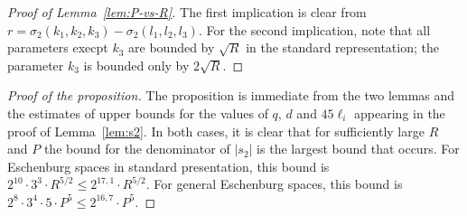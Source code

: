 \documentclass{article}
\newcommand{\abs}[1]{\left|#1\right|}
\begin{document}
\begin{proof}[Proof of Lemma~\ref{lem:P-vs-R}]
The first implication is clear from \(r = \sigma_2(k_1,k_2,k_3) - \sigma_2(l_1,l_2,l_3)\).
For the second implication, note that all parameters execpt \(k_3\) are bounded by \(\sqrt{R}\) in the standard representation; the parameter \(k_3\) is bounded only by \(2\sqrt{R}\).
\end{proof}


\begin{proof}[Proof of the proposition]
The proposition is immediate from the two lemmas and the estimates of upper bounds for the values of \(q\), \(d\) and \(45\ell_i\) appearing in the proof of Lemma~\ref{lem:s2}.  In both cases, it is clear that for sufficiently large \(R\) and \(P\) the bound for the denominator of \(\abs{s_2}\) is the largest bound that occurs.  For Eschenburg spaces in standard presentation, this bound is 
\(
2^{10}·3^3·R^{5/2} \leq 2^{17,1}·R^{5/2}.
\)
For general Eschenburg spaces, this bound is
\(
    2^{8}·3^4·5·P^{5} \leq 2^{16,7}·P^5
\).
\end{proof}
\end{document}
